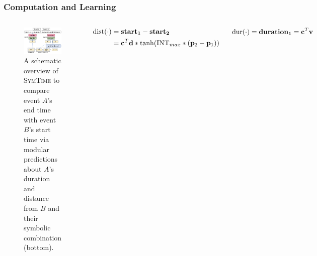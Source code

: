 \documentclass[10pt,aspectratio=43]{beamer}
\newcommand{\modelsymbolic}{\textsc{SymTime}}
\begin{document}
	
	\begin{frame}
	    \frametitle{\textbf{Computation and Learning}}
            \begin{columns}[c]
                    \begin{figure}
            	        \centering
            	        \includegraphics[width=1.0\textwidth]{figures/movel_v2.pdf}
            	        \caption{A schematic overview of \modelsymbolic{} to compare event $A$'s end time with event $B$'s start time via modular predictions about $A$'s duration and distance from $B$ and their symbolic combination (bottom).}
            	        \label{fig:model-overview}
        	        \end{figure}
        	        \begin{small}
                    	\begin{equation} 
            	            \label{eq-start-module}
            	            \begin{split}
                    	        \mathrm{dist}(\cdot) &= \mathbf{start_1} - \mathbf{start_2} \\
                    	        &= \vb{c}^T\vb{d}*\mathrm{tanh}(\textrm{INT}_{max}*(\mathbf{p}_2-\mathbf{p}_1)) \\
            	            \end{split}
            	        \end{equation}        	             
        	        \end{small}
        	        \begin{small}
             	        \begin{equation}
            	            \mathrm{dur}(\cdot) = \mathbf{duration_1} = \vb{c}^T\vb{v}
            	        \end{equation}       	        
        	        \end{small}

            \end{columns}
	\end{frame}
	
\end{document}

